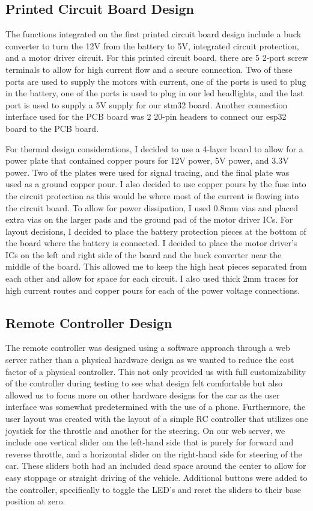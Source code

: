 \documentclass[11pt]{article}
\begin{document}
\subsection{Printed Circuit Board Design}
The functions integrated on the first printed circuit board design include a buck converter to turn the 12V from the battery to 5V, integrated circuit protection, and a motor driver circuit. For this printed circuit board, there are 5 2-port screw terminals to allow for high current flow and a secure connection. Two of these ports are used to supply the motors with current, one of the ports is used to plug in the battery, one of the ports is used to plug in our led headlights, and the last port is used to supply a 5V supply for our stm32 board. Another connection interface used for the PCB board was 2 20-pin headers to connect our esp32 board to the PCB board.

For thermal design considerations, I decided to use a 4-layer board to allow for a power plate that contained copper pours for 12V power, 5V power, and 3.3V power.  Two of the plates were used for signal tracing, and the final plate was used as a ground copper pour. I also decided to use copper pours by the fuse into the circuit protection as this would be where most of the current is flowing into the circuit board. To allow for power dissipation, I used 0.8mm vias and placed extra vias on the larger pads and the ground pad of the motor driver ICs. For layout decisions, I decided to place the battery protection pieces at the bottom of the board where the battery is connected. I decided to place the motor driver's ICs on the left and right side of the board and the buck converter near the middle of the board. This allowed me to keep the high heat pieces separated from each other and allow for space for each circuit. I also used thick 2mm traces for high current routes and copper pours for each of the power voltage connections.

\subsection{Remote Controller Design}
The remote controller was designed using a software approach through a web server rather than a physical hardware design as we wanted to reduce the cost factor of a physical controller. This not only provided us with full customizability of the controller during testing to see what design felt comfortable but also allowed us to focus more on other hardware designs for the car as the user interface was somewhat predetermined with the use of a phone. Furthermore, the user layout was created with the layout of a simple RC controller that utilizes one joystick for the throttle and another for the steering. On our web server, we include one vertical slider om the left-hand side that is purely for forward and reverse throttle, and a horizontal slider on the right-hand side for steering of the car. These sliders both had an included dead space around the center to allow for easy stoppage or straight driving of the vehicle. Additional buttons were added to the controller, specifically to toggle the LED’s and reset the sliders to their base position at zero.  
\end{document}
